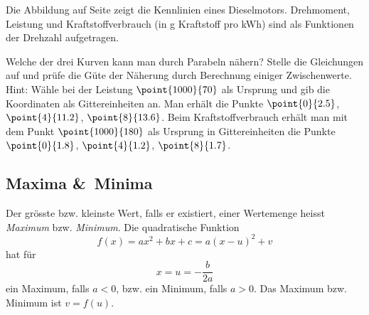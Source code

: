 \documentclass[%
11pt,%
twoside,%
titlepage,%
german,%
headsepline%
]{scrartcl}
\begin{document}

\begin{ueb}[Leistung]
Die Abbildung auf Seite zeigt die Kennlinien eines Dieselmotors. Drehmoment, Leistung und Kraftstoffverbrauch (in g Kraftstoff pro kWh) sind als Funktionen der Drehzahl aufgetragen.

\begin{figure}
\begin{center}
\end{center}
\end{figure}
Welche der drei Kurven kann man durch Parabeln n\"ahern? Stelle die Gleichungen auf und pr\"ufe die G\"ute der N\"aherung durch Berechnung einiger Zwischenwerte.
Hint: W\"ahle bei der Leistung $\point{1000}{70}$ als Ursprung und gib die Koordinaten als Gittereinheiten an. Man erh\"alt die Punkte $\point{0}{2.5}$, $\point{4}{11.2}$, $\point{8}{13.6}$. Beim Kraftstoffverbrauch erh\"alt man mit dem Punkt $\point{1000}{180}$ als Ursprung in Gittereinheiten die Punkte $\point{0}{1.8}$, $\point{4}{1.2}$, $\point{8}{1.7}$.
\end{ueb}

\subsection{Maxima \&\ Minima}
Der gr\"osste bzw. kleinste Wert, falls er existiert, einer Wertemenge heisst \emph{Maximum} bzw. \emph{Minimum}. Die quadratische Funktion
$$f(x)=ax^2+bx+c=a(x-u)^2+v$$
hat f\"ur
$$x =u=-\frac{b}{2a}$$
ein Maximum, falls $a<0$, bzw. ein Minimum, falls $a>0$. Das Maximum bzw. Minimum ist $v =f(u)$.
\end{document}
